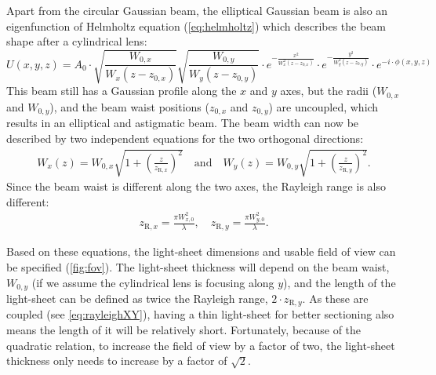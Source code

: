     Apart from the circular Gaussian beam, the elliptical Gaussian beam is also an eigenfunction of Helmholtz equation (\autoref{eq:helmholtz}) which describes the beam shape after a cylindrical lens:
    \begin{equation}
      U(x,y,z) = A_0 \cdot \sqrt{\frac{W_{0,x}}{W_x(z-z_{0,x})}} \sqrt{\frac{W_{0,y}}{W_y(z-z_{0,y})}} \cdot e^{-\frac{x^2}{W_x^2(z-z_{0,x})}} \cdot e^{-\frac{y^2}{W_y^2(z-z_{0,y})}} \cdot e^{-i\cdot \phi(x,y,z)}
    \end{equation}
    This beam still has a Gaussian profile along the $x$ and $y$ axes, but the radii ($W_{0,x}$ and $W_{0,y}$), and the beam waist positions ($z_{0,x}$ and $z_{0,y}$) are uncoupled, which results in an elliptical and astigmatic beam. The beam width can now be described by two independent equations for the two orthogonal directions:
    \begin{align}
      W_x(z) = W_{0,x}\sqrt{1+\left( \frac{z}{z_{\mathrm{R},x}} \right)^2}\mathrm{\quad and \quad } W_y(z) = W_{0,y}\sqrt{1+\left( \frac{z}{z_{\mathrm{R},y}} \right)^2}.
    \end{align}
    Since the beam waist is different along the two axes, the Rayleigh range is also different:
    \begin{align}
      z_{\mathrm{R},x} = \frac{\pi W_{x,0}^2}{\lambda}, \quad
      z_{\mathrm{R},y} = \frac{\pi W_{y,0}^2}{\lambda}.
      \label{eq:rayleighXY}
    \end{align}
    
    
    Based on these equations, the light-sheet dimensions and usable field of view can be specified (\autoref{fig:fov}). The light-sheet thickness will depend on the beam waist, $W_{0,y}$ (if we assume the cylindrical lens is focusing along $y$), and the length of the light-sheet can be defined as twice the Rayleigh range, $2 \cdot z_{\mathrm{R},y}$. As these are coupled (see \autoref{eq:rayleighXY}), having a thin light-sheet for better sectioning also means the length of it will be relatively short. Fortunately, because of the quadratic relation, to increase the field of view by a factor of two, the light-sheet thickness only needs to increase by a factor of $\sqrt{2}$.

